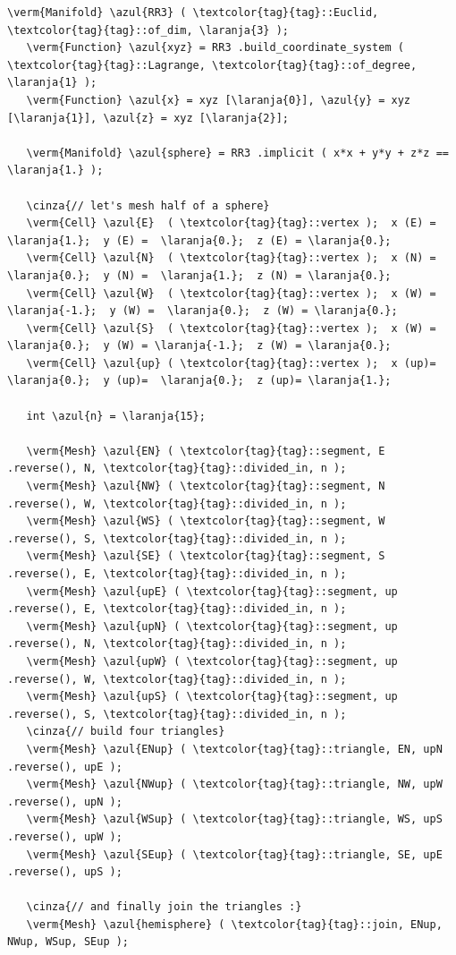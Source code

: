 \begin{Verbatim}[commandchars=\\\{\},formatcom=\small\tt,frame=single,
   label=parag-\ref{\numb section 2.\numb parag 6}.cpp,rulecolor=\color{coment},
   baselinestretch=0.94,framesep=2mm                                            ]
   \verm{Manifold} \azul{RR3} ( \textcolor{tag}{tag}::Euclid, \textcolor{tag}{tag}::of_dim, \laranja{3} );
   \verm{Function} \azul{xyz} = RR3 .build_coordinate_system ( \textcolor{tag}{tag}::Lagrange, \textcolor{tag}{tag}::of_degree, \laranja{1} );
   \verm{Function} \azul{x} = xyz [\laranja{0}], \azul{y} = xyz [\laranja{1}], \azul{z} = xyz [\laranja{2}];

   \verm{Manifold} \azul{sphere} = RR3 .implicit ( x*x + y*y + z*z == \laranja{1.} );

   \cinza{// let's mesh half of a sphere}
   \verm{Cell} \azul{E}  ( \textcolor{tag}{tag}::vertex );  x (E) =  \laranja{1.};  y (E) =  \laranja{0.};  z (E) = \laranja{0.};
   \verm{Cell} \azul{N}  ( \textcolor{tag}{tag}::vertex );  x (N) =  \laranja{0.};  y (N) =  \laranja{1.};  z (N) = \laranja{0.};
   \verm{Cell} \azul{W}  ( \textcolor{tag}{tag}::vertex );  x (W) = \laranja{-1.};  y (W) =  \laranja{0.};  z (W) = \laranja{0.};
   \verm{Cell} \azul{S}  ( \textcolor{tag}{tag}::vertex );  x (W) =  \laranja{0.};  y (W) = \laranja{-1.};  z (W) = \laranja{0.};
   \verm{Cell} \azul{up} ( \textcolor{tag}{tag}::vertex );  x (up)=  \laranja{0.};  y (up)=  \laranja{0.};  z (up)= \laranja{1.};

   int \azul{n} = \laranja{15};

   \verm{Mesh} \azul{EN} ( \textcolor{tag}{tag}::segment, E .reverse(), N, \textcolor{tag}{tag}::divided_in, n );
   \verm{Mesh} \azul{NW} ( \textcolor{tag}{tag}::segment, N .reverse(), W, \textcolor{tag}{tag}::divided_in, n );
   \verm{Mesh} \azul{WS} ( \textcolor{tag}{tag}::segment, W .reverse(), S, \textcolor{tag}{tag}::divided_in, n );
   \verm{Mesh} \azul{SE} ( \textcolor{tag}{tag}::segment, S .reverse(), E, \textcolor{tag}{tag}::divided_in, n );
   \verm{Mesh} \azul{upE} ( \textcolor{tag}{tag}::segment, up .reverse(), E, \textcolor{tag}{tag}::divided_in, n );
   \verm{Mesh} \azul{upN} ( \textcolor{tag}{tag}::segment, up .reverse(), N, \textcolor{tag}{tag}::divided_in, n );
   \verm{Mesh} \azul{upW} ( \textcolor{tag}{tag}::segment, up .reverse(), W, \textcolor{tag}{tag}::divided_in, n );
   \verm{Mesh} \azul{upS} ( \textcolor{tag}{tag}::segment, up .reverse(), S, \textcolor{tag}{tag}::divided_in, n );
   \cinza{// build four triangles}
   \verm{Mesh} \azul{ENup} ( \textcolor{tag}{tag}::triangle, EN, upN .reverse(), upE );
   \verm{Mesh} \azul{NWup} ( \textcolor{tag}{tag}::triangle, NW, upW .reverse(), upN );
   \verm{Mesh} \azul{WSup} ( \textcolor{tag}{tag}::triangle, WS, upS .reverse(), upW );
   \verm{Mesh} \azul{SEup} ( \textcolor{tag}{tag}::triangle, SE, upE .reverse(), upS );

   \cinza{// and finally join the triangles :}
   \verm{Mesh} \azul{hemisphere} ( \textcolor{tag}{tag}::join, ENup, NWup, WSup, SEup );
\end{Verbatim}

